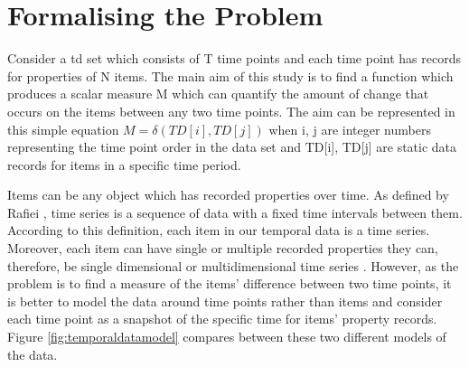 \section{Formalising the Problem}

Consider a \acrfull{td} set which consists of T time points and each time point has records for properties of N items. The main aim of this study is to find a function which produces a scalar measure M which can quantify the amount of change that occurs on the items between any two time points. The aim can be represented in this simple equation $M = \delta (TD[i], TD[j])$ when i, j are integer numbers representing the time point order in the data set and TD[i], TD[j] are static data records for items in a specific time period.


Items can be any object which has recorded properties over time. As defined by Rafiei \cite{Rafiei1998}, time series is a sequence of data with a fixed time intervals between them. According to this definition, each item in our temporal data is a time series. Moreover, each item can have single or multiple recorded properties they can, therefore, be single dimensional or multidimensional time series \cite{Vlachos2003}. However, as the problem is to find a measure of the items' difference between two time points, it is better to model the data around time points rather than items and consider each time point as a snapshot of the specific time for items' property records. Figure \ref{fig:temporaldatamodel} compares between these two different models of the data.



